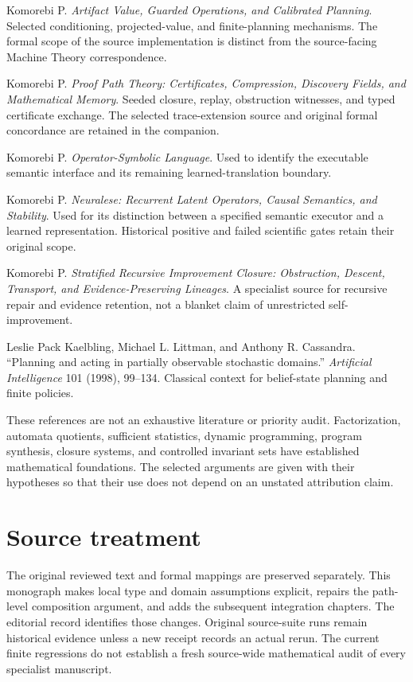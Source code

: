 \begin{description}[style=nextline]
\item[AVOC] Komorebi P. \emph{Artifact Value, Guarded Operations, and Calibrated Planning}. Selected conditioning, projected-value, and finite-planning mechanisms. The formal scope of the source implementation is distinct from the source-facing Machine Theory correspondence.
\item[PPT] Komorebi P. \emph{Proof Path Theory: Certificates, Compression, Discovery Fields, and Mathematical Memory}. Seeded closure, replay, obstruction witnesses, and typed certificate exchange. The selected trace-extension source and original formal concordance are retained in the companion.
\item[OSL] Komorebi P. \emph{Operator-Symbolic Language}. Used to identify the executable semantic interface and its remaining learned-translation boundary.
\item[NEU] Komorebi P. \emph{Neuralese: Recurrent Latent Operators, Causal Semantics, and Stability}. Used for its distinction between a specified semantic executor and a learned representation. Historical positive and failed scientific gates retain their original scope.
\item[SRIC] Komorebi P. \emph{Stratified Recursive Improvement Closure: Obstruction, Descent, Transport, and Evidence-Preserving Lineages}. A specialist source for recursive repair and evidence retention, not a blanket claim of unrestricted self-improvement.
\item[KLC] Leslie Pack Kaelbling, Michael L. Littman, and Anthony R. Cassandra. ``Planning and acting in partially observable stochastic domains.'' \emph{Artificial Intelligence} 101 (1998), 99--134. Classical context for belief-state planning and finite policies.
\end{description}

These references are not an exhaustive literature or priority audit. Factorization, automata quotients, sufficient statistics, dynamic programming, program synthesis, closure systems, and controlled invariant sets have established mathematical foundations. The selected arguments are given with their hypotheses so that their use does not depend on an unstated attribution claim.

\section*{Source treatment}
The original reviewed text and formal mappings are preserved separately. This monograph makes local type and domain assumptions explicit, repairs the path-level composition argument, and adds the subsequent integration chapters. The editorial record identifies those changes. Original source-suite runs remain historical evidence unless a new receipt records an actual rerun. The current finite regressions do not establish a fresh source-wide mathematical audit of every specialist manuscript.
